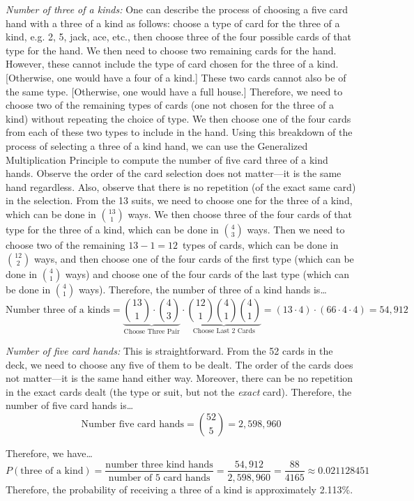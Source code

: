 \documentclass[11pt,letterpaper]{article}
\begin{document}
{\itshape Number of three of a kinds:} One can describe the process of choosing a five card hand with a three of a kind as follows: choose a type of card for the three of a kind, e.g. 2, 5, jack, ace, etc., then choose three of the four possible cards of that type for the hand. We then need to choose two remaining cards for the hand. However, these cannot include the type of card chosen for the three of a kind. [Otherwise, one would have a four of a kind.] These two cards cannot also be of the same type. [Otherwise, one would have a full house.] Therefore, we need to choose two of the remaining types of cards (one not chosen for the three of a kind) without repeating the choice of type. We then choose one of the four cards from each of these two types to include in the hand. Using this breakdown of the process of selecting a three of a kind hand, we can use the Generalized Multiplication Principle to compute the number of five card three of a kind hands. Observe the order of the card selection does not matter---it is the same hand regardless. Also, observe that there is no repetition (of the exact same card) in the selection. From the 13 suits, we need to choose one for the three of a kind, which can be done in $\binom{13}{1}$ ways. We then choose three of the four cards of that type for the three of a kind, which can be done in $\binom{4}{3}$ ways. Then we need to choose two of the remaining $13 - 1= 12$~types of cards, which can be done in $\binom{12}{2}$ ways, and then choose one of the four cards of the first type (which can be done in $\binom{4}{1}$ ways) and choose one of the four cards of the last type (which can be done in $\binom{4}{1}$ ways). Therefore, the number of three of a kind hands is\dots
	\[
	\text{Number three of a kinds}= \underbrace{\binom{13}{1} \cdot \binom{4}{3}}_{\text{Choose Three Pair}} \cdot \underbrace{\binom{12}{1} \binom{4}{1} \binom{4}{1}}_{\text{Choose Last 2 Cards}}= (13 \cdot 4) \cdot (66 \cdot 4 \cdot 4)= 54,\!912	
	\] \pspace

{\itshape Number of five card hands:} This is straightforward. From the 52 cards in the deck, we need to choose any five of them to be dealt. The order of the cards does not matter---it is the same hand either way. Moreover, there can be no repetition in the exact cards dealt (the type or suit, but not the \textit{exact} card). Therefore, the number of five card hands is\dots
	\[
	\text{Number five card hands}= \binom{52}{5}= 2,\!598,\!960
	\] 

Therefore, we have\dots
	\[
	P(\text{three of a kind})= \dfrac{\text{number three kind hands}}{\text{number of 5 card hands}}= \dfrac{54,\!912}{2,\!598,\!960}= \dfrac{88}{4165} \approx 0.021128451
	\]
Therefore, the probability of receiving a three of a kind is approximately 2.113\%. 
\end{document}
